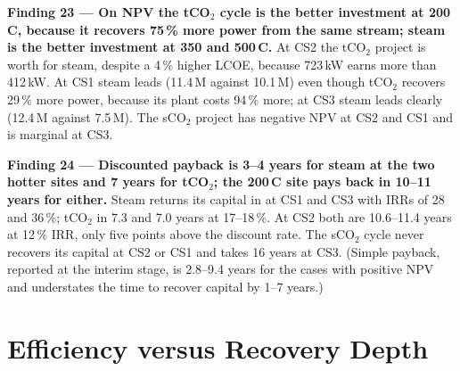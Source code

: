 \begin{findingbox}
\textbf{Finding 23 --- On NPV the tCO$_2$ cycle is the better investment at
200\,\textdegree C, because it recovers 75\,\% more power from the same
stream; steam is the better investment at 350 and 500\,\textdegree C.}
At CS2 the tCO$_2$ project is worth 
for steam, despite a 4\,\% higher LCOE, because 723\,kW earns more than
412\,kW. At CS1 steam leads (11.4\,M against 10.1\,M) even though tCO$_2$
recovers 29\,\% more power, because its plant costs 94\,\% more; at CS3
steam leads clearly (12.4\,M against 7.5\,M). The sCO$_2$ project has
negative NPV at CS2 and CS1 and is marginal at CS3.
\end{findingbox}

\begin{findingbox}
\textbf{Finding 24 --- Discounted payback is 3--4 years for steam at the two
hotter sites and 7 years for tCO$_2$; the 200\,\textdegree C site pays back
in 10--11 years for either.}
Steam returns its capital in  at CS1 and CS3
with IRRs of 28 and 36\,\%; tCO$_2$ in 7.3 and 7.0 years at 17--18\,\%. At
CS2 both are 10.6--11.4 years at 12\,\% IRR, only five points above the
discount rate. The sCO$_2$ cycle never recovers its capital at CS2 or CS1 and
takes 16 years at CS3. (Simple payback, reported at the interim stage, is
2.8--9.4 years for the cases with positive NPV and understates the time to
recover capital by 1--7 years.)
\end{findingbox}

\section{Efficiency versus Recovery Depth}
\label{sec:rq3_recovery}

